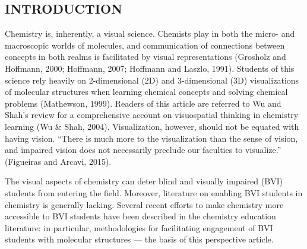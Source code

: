 \documentclass[11.5pt]{sig-alternate} %
\begin{document}
\begin{large}
\section*{INTRODUCTION}

Chemistry is, inherently, a visual science. Chem\-ists play in both the micro- and macroscopic worlds of molecules, and communication of connections between concepts in both realms is facilitated by visual representations (Grosholz and Hoffmann, 2000; Hoffmann, 2007; Hoffmann and Laszlo, 1991). Students of this science rely heavily on 2-dimensional (2D) and 3-dimensional (3D) visualizations of molecular structures when learning chemical concepts and solving chemical problems (Mathewson, 1999). Readers of this article are referred to Wu and Shah’s review for a comprehensive account on visuospatial thinking in chemistry learning (Wu \& Shah, 2004). Visualization, however, should not be equated with having vision. “There is much more to the visualization than the sense of vision, and impaired vision does not necessarily preclude our faculties to visualize.” (Figueiras and Arcavi, 2015). 

The visual aspects of chemistry can deter blind and visually impaired (BVI) students from entering the field. Moreover, literature on enabling BVI students in chemistry is generally lacking. Several recent efforts to make chemistry more accessible to BVI students have been described in the chemistry education literature: in particular, methodologies for facilitating engagement of BVI students with molecular structures — the basis of this perspective article. 


\end{large}
\end{document}
